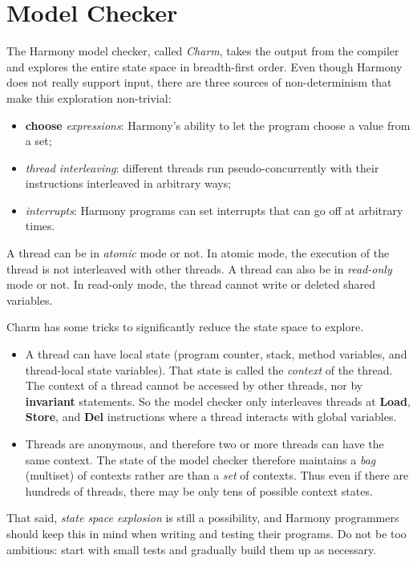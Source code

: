 \documentclass{report}
\begin{document}
\section{Model Checker}

The Harmony model checker, called \emph{Charm}, takes the output from
the compiler and explores the entire state space in breadth-first order.
Even though Harmony does not really support input, there are three sources of
non-determinism that make this exploration non-trivial:

\begin{itemize}
\item \textbf{choose} \emph{expressions}: Harmony's ability to let the program
choose a value from a set;
\item \emph{thread interleaving}: different threads run pseudo-concurrently
with their instructions interleaved in arbitrary ways;
\item \emph{interrupts}: Harmony programs can set interrupts that can go
off at arbitrary times.
\end{itemize}

A thread can be in \emph{atomic} mode or not.
In atomic mode, the execution of the thread is not interleaved with
other threads.
A thread can also be in \emph{read-only} mode or not.
In read-only mode, the thread cannot write or deleted shared variables.

Charm has some tricks to significantly reduce the state space to explore.
\begin{itemize}
\item A thread can have local state (program counter, stack,
method variables, and thread-local state variables).
That state is called the \emph{context} of the thread.
The context of a thread cannot be accessed by other
threads, nor by \textbf{invariant} statements.
So the model checker only interleaves threads at \textbf{Load},
\textbf{Store}, and \textbf{Del} instructions where a thread
interacts with global
variables.
\item Threads are anonymous, and therefore two or more threads can
have the same context.  The state of the model checker therefore maintains
a \emph{bag} (multiset) of contexts rather are than a \emph{set} of contexts.
Thus even if there are hundreds of threads, there may be only tens of
possible context states.
\end{itemize}

That said, \emph{state space explosion} is still a possibility, and
Harmony programmers should keep this in mind when writing and testing
their programs.  Do not be too ambitious: start with small tests and
gradually build them up as necessary.
\end{document}
